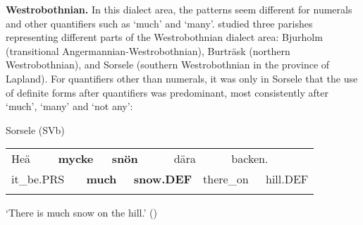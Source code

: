 \begin{styleBodytextC}
\textbf{Westrobothnian.} In this dialect area, the patterns seem different for numerals and other quantifiers such as ‘much’ and ‘many’. \citet{BergholmEtAl1999} studied three parishes representing different parts of the Westrobothnian dialect area: Bjurholm (transitional Angermannian-Westrobothnian), Burträsk (northern Westrobothnian), and Sorsele (southern Westrobothnian in the province of Lapland). For quantifiers other than numerals, it was only in Sorsele that the use of definite forms after quantifiers was predominant, most consistently after ‘much’, ‘many’ and ‘not any’:

\end{styleBodytextC}

\begin{listWWNumileveli}
\item 

\begin{styleExample}
Sorsele (SVb)

\end{styleExample}

\end{listWWNumileveli}

\begin{listWWNumxxxivleveli}
\item 

\end{listWWNumxxxivleveli}

\begin{tabular}{llllllllll}
\lsptoprule
Heä & \multicolumn{2}{l}{{\bfseries mycke}

} & \multicolumn{2}{l}{{\bfseries snön}

} & \multicolumn{2}{l}{dära

} & \multicolumn{2}{l}{backen.

} & \\
\multicolumn{2}{l}{it\_be.PRS

} & \multicolumn{2}{l}{{\bfseries much}

} & \multicolumn{2}{l}{{\bfseries snow.DEF}

} & \multicolumn{2}{l}{there\_on

} & \multicolumn{2}{l}{hill.DEF

}\\
\lspbottomrule
\end{tabular}

\begin{styleTranslation}
‘There is much snow on the hill.’ (\citet[24]{BergholmEtAl1999})

\end{styleTranslation}


